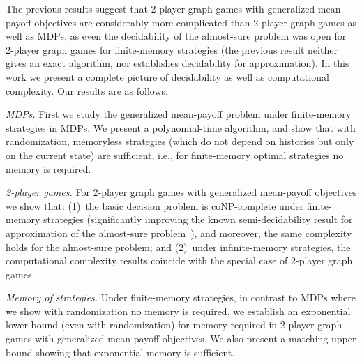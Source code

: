\documentclass{article}
\newcommand{\half}{}
\begin{document}
\smallskip{}
The previous results suggest that 2\half-player graph games with generalized 
mean-payoff objectives are considerably more complicated than 2-player graph 
games as well as MDPs, as even the decidability of the almost-sure problem was 
open for 2\half-player graph games for finite-memory strategies (the previous 
result neither gives an exact algorithm, nor establishes decidability for 
approximation).
In this work we present a complete picture of decidability as well as computational 
complexity. 
Our results are as follows:
\begin{compactenum}

\item {\em MDPs.} First we study the generalized mean-payoff problem under 
finite-memory strategies in MDPs. We present a polynomial-time algorithm,
and show that with randomization, memoryless strategies (which do not depend on
histories but only on the current state) are sufficient,
i.e., for finite-memory optimal strategies no memory is required.

\item {\em 2\half-player games.} 
For 2\half-player graph games with generalized mean-payoff objectives we show 
that: 
(1)~the basic decision problem is coNP-complete under finite-memory strategies (significantly improving 
the known semi-decidability result for approximation of the almost-sure 
problem~\cite{BKTW15}), and moreover, the same complexity holds for the almost-sure problem; 
and (2)~under infinite-memory strategies, the computational complexity results 
coincide with the special case of 2-player graph games.

\item {\em Memory of strategies.} Under finite-memory strategies, 
in contrast to MDPs where we show with randomization no memory is required,
we establish an exponential lower bound (even with randomization) for memory 
required in 2\half-player graph games with generalized mean-payoff objectives.
We also present a matching upper bound showing that exponential memory
is sufficient.
\end{compactenum}
\end{document}
